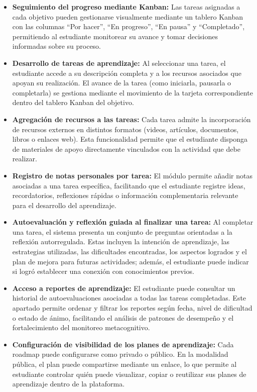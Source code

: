 \begin{itemize}
\item \textbf{Seguimiento del progreso mediante Kanban:} Las tareas asignadas a cada objetivo pueden gestionarse visualmente mediante un tablero Kanban con las columnas “Por hacer”, “En progreso”, “En pausa” y “Completado”, permitiendo al estudiante monitorear su avance y tomar decisiones informadas sobre su proceso.

\item \textbf{Desarrollo de tareas de aprendizaje:} Al seleccionar una tarea, el estudiante accede a su descripción completa y a los recursos asociados que apoyan su realización. El avance de la tarea (como iniciarla, pausarla o completarla) se gestiona mediante el movimiento de la tarjeta correspondiente dentro del tablero Kanban del objetivo.

\item \textbf{Agregación de recursos a las tareas:} Cada tarea admite la incorporación de recursos externos en distintos formatos (videos, artículos, documentos, libros o enlaces web). Esta funcionalidad permite que el estudiante disponga de materiales de apoyo directamente vinculados con la actividad que debe realizar.

\item \textbf{Registro de notas personales por tarea:} El módulo permite añadir notas asociadas a una tarea específica, facilitando que el estudiante registre ideas, recordatorios, reflexiones rápidas o información complementaria relevante para el desarrollo del aprendizaje.

\item \textbf{Autoevaluación y reflexión guiada al finalizar una tarea:} Al completar una tarea, el sistema presenta un conjunto de preguntas orientadas a la reflexión autorregulada. Estas incluyen la intención de aprendizaje, las estrategias utilizadas, las dificultades encontradas, los aspectos logrados y el plan de mejora para futuras actividades; además, el estudiante puede indicar si logró establecer una conexión con conocimientos previos.

\item \textbf{Acceso a reportes de aprendizaje:} El estudiante puede consultar un historial de autoevaluaciones asociadas a todas las tareas completadas. Este apartado permite ordenar y filtrar los reportes según fecha, nivel de dificultad o estado de ánimo, facilitando el análisis de patrones de desempeño y el fortalecimiento del monitoreo metacognitivo.

\item \textbf{Configuración de visibilidad de los planes de aprendizaje:} Cada roadmap puede configurarse como privado o público. En la modalidad pública, el plan puede compartirse mediante un enlace, lo que permite al estudiante controlar quién puede visualizar, copiar o reutilizar sus planes de aprendizaje dentro de la plataforma.

\end{itemize}


